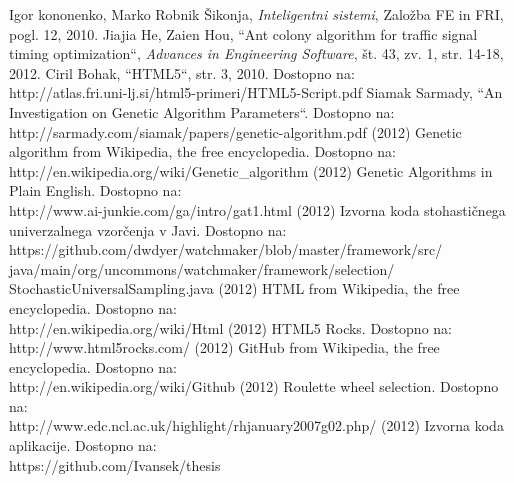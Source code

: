 \documentclass[a4paper, 12pt]{book}
\begin{document}
 
\begin{thebibliography}{99}
 Igor kononenko, Marko Robnik \v Sikonja, \textit{Inteligentni sistemi}, Zalo\v zba FE in FRI, pogl. 12, 2010.
 Jiajia He, Zaien Hou, ``Ant colony algorithm for traffic signal timing optimization``, \textit{Advances in Engineering Software}, \v st. 43, zv. 1, str.  14-18, 2012.
 Ciril Bohak, ``HTML5``, str. 3, 2010. Dostopno na:\\
http://atlas.fri.uni-lj.si/html5-primeri/HTML5-Script.pdf
 Siamak Sarmady, ``An Investigation on Genetic Algorithm Parameters``. Dostopno na:\\ http://sarmady.com/siamak/papers/genetic-algorithm.pdf
 (2012) Genetic algorithm from Wikipedia, the free encyclopedia. Dostopno na:\\
http://en.wikipedia.org/wiki/Genetic\_algorithm
 (2012) Genetic Algorithms in Plain English. Dostopno na:\\
http://www.ai-junkie.com/ga/intro/gat1.html
 (2012) Izvorna koda stohasti\v cnega univerzalnega vzor\v cenja v Javi. Dostopno na:\\
https://github.com/dwdyer/watchmaker/blob/master/framework/src/\\
java/main/org/uncommons/watchmaker/framework/selection/\\
StochasticUniversalSampling.java
 (2012) HTML from Wikipedia, the free encyclopedia. Dostopno na:\\
http://en.wikipedia.org/wiki/Html
 (2012) HTML5 Rocks. Dostopno na:\\
http://www.html5rocks.com/
 (2012) GitHub from Wikipedia, the free encyclopedia. Dostopno na:\\
http://en.wikipedia.org/wiki/Github
(2012) Roulette wheel selection. Dostopno na:\\
http://www.edc.ncl.ac.uk/highlight/rhjanuary2007g02.php/
(2012) Izvorna koda aplikacije. Dostopno na:\\
https://github.com/Ivansek/thesis
\end{thebibliography}
\end{document}
